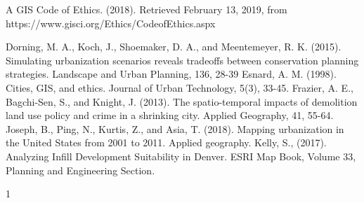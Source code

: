 \documentclass[20pt]{article}
\begin{document}
\newpage
\begin{thebibliography}{1}

A GIS Code of Ethics. (2018). Retrieved February 13, 2019, from https://www.gisci.org/Ethics/CodeofEthics.aspx

\vspace{5mm}\newline Dorning, M. A., Koch, J., Shoemaker, D. A., and Meentemeyer, R. K. (2015). Simulating urbanization scenarios reveals tradeoffs between conservation planning strategies. Landscape and Urban Planning, 136, 28-39 
\vspace{5mm}\newline Esnard, A. M. (1998). Cities, GIS, and ethics. Journal of Urban Technology, 5(3), 33-45.
\vspace{5mm}\newline *Frazier, A. E., Bagchi-Sen, S., and Knight, J. (2013). The spatio-temporal impacts of demolition land use policy and crime in a shrinking city. Applied Geography, 41, 55-64.
\vspace{5mm}\newline *Joseph, B., Ping, N., Kurtis, Z., and Asia, T. (2018). Mapping urbanization in the United States from 2001 to 2011. Applied geography.
\vspace{5mm}\newline Kelly, S., (2017). Analyzing Infill Development Suitability in Denver. ESRI Map Book, Volume 33, Planning and Engineering Section.



\end{thebibliography}{1}




 
 
\end{document}
